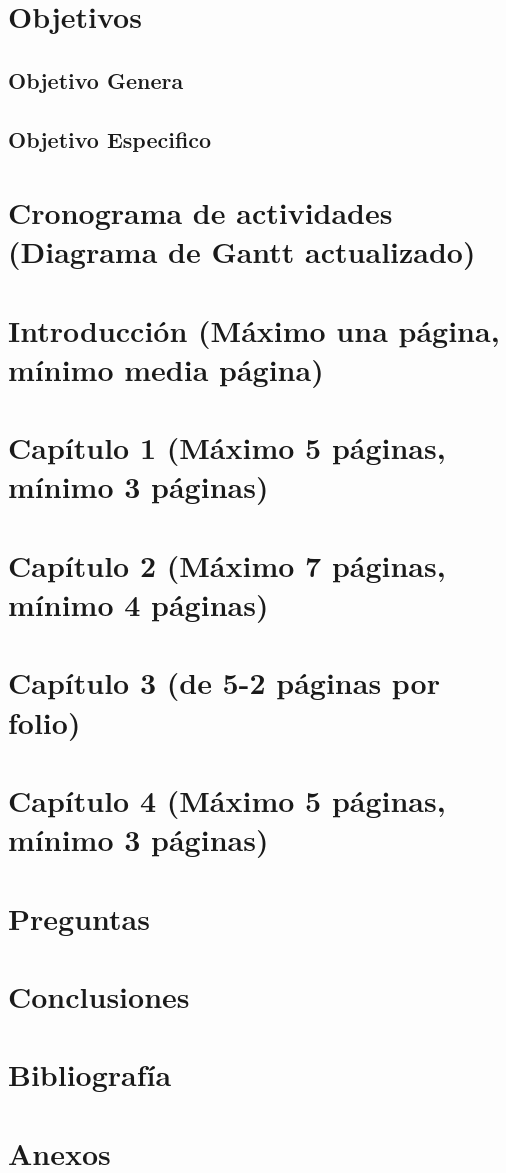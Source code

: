 \documentclass[12pt]{article}
\begin{document}
	
	\tableofcontents
	\newpage
	
	\section{Objetivos}
	\subsection{Objetivo Genera}
	\subsection{Objetivo Especifico}
	\section{Cronograma de actividades (Diagrama de Gantt actualizado)}
	\section{Introducción (Máximo una página, mínimo media página)}
	\section{Capítulo 1 (Máximo 5 páginas, mínimo 3 páginas)}
	\section{Capítulo 2 (Máximo 7 páginas, mínimo 4 páginas)}
	\section{Capítulo 3 (de 5-2 páginas por folio)}
	\section{Capítulo 4 (Máximo 5 páginas, mínimo 3 páginas)}
	\section{Preguntas}
	\section{Conclusiones}
	\section{Bibliografía}
	\section{Anexos}
	
\end{document}
